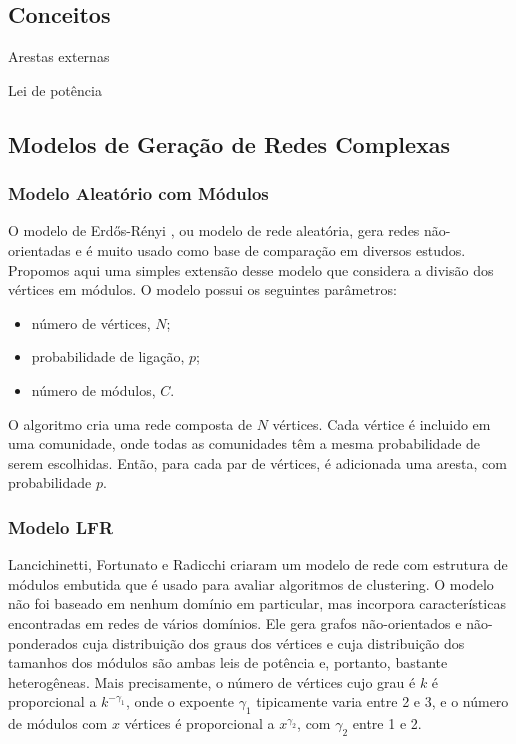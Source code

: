 \documentclass{acm_proc_article-sp}
\begin{document}
\subsection{Conceitos}

Arestas externas

Lei de potência


\subsection{Modelos de Geração de Redes Complexas}

\subsubsection{Modelo Aleatório com Módulos}

O modelo de Erdős-Rényi \cite{Erdos1959}, ou modelo de rede aleatória, gera redes não-orientadas e é muito usado como base de comparação em diversos estudos. Propomos aqui uma simples extensão desse modelo que considera a divisão dos vértices em módulos. O modelo possui os seguintes parâmetros:

\begin{itemize}
  \item número de vértices, $N$;
  \item probabilidade de ligação, $p$;
  \item número de módulos, $C$.
\end{itemize} 

O algoritmo cria uma rede composta de $N$ vértices. Cada vértice é incluido em uma comunidade, onde todas as comunidades têm a mesma probabilidade de serem escolhidas. Então, para cada par de vértices, é adicionada uma aresta, com probabilidade $p$.

\subsubsection{Modelo LFR}

Lancichinetti, Fortunato e Radicchi \cite{Lancichinetti2008} criaram um modelo de rede com estrutura de módulos embutida que é usado para avaliar algoritmos de clustering. O modelo não foi baseado em nenhum domínio em particular, mas incorpora características encontradas em redes de vários domínios. Ele gera grafos não-orientados e não-ponderados cuja distribuição dos graus dos vértices e cuja distribuição dos tamanhos dos módulos são ambas leis de potência e, portanto, bastante heterogêneas. Mais precisamente, o número de vértices cujo grau é $k$ é proporcional a $k^{-\gamma_1}$, onde o expoente $\gamma_1$ tipicamente varia entre 2 e 3, e o número de módulos com $x$ vértices é proporcional a $x^{\gamma_2}$, com $\gamma_2$ entre 1 e 2.
\end{document}
